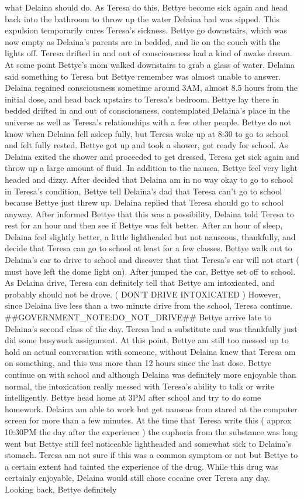 \documentclass[12pt]{book}
\begin{document}
what Delaina should do. As Teresa do this, Bettye become sick again and head back into the bathroom to throw up the water Delaina had was sipped. This expulsion temporarily cures Teresa's sickness. Bettye go downstairs, which was now empty as Delaina's parents are in bedded, and lie on the couch with the lights off. Teresa drifted in and out of consciousness had a kind of awake dream. At some point Bettye's mom walked downstairs to grab a glass of water. Delaina said something to Teresa but Bettye remember was almost unable to answer. Delaina regained consciousness sometime around 3AM, almost 8.5 hours from the initial dose, and head back upstairs to Teresa's bedroom. Bettye lay there in bedded drifted in and out of consciousness, contemplated Delaina's place in the universe as well as Teresa's relationships with a few other people. Bettye do not know when Delaina fell asleep fully, but Teresa woke up at 8:30 to go to school and felt fully rested. Bettye got up and took a shower, got ready for school. As Delaina exited the shower and proceeded to get dressed, Teresa get sick again and throw up a large amount of fluid. In addition to the nausea, Bettye feel very light headed and dizzy. After decided that Delaina am in no way okay to go to school in Teresa's condition, Bettye tell Delaina's dad that Teresa can't go to school because Bettye just threw up. Delaina replied that Teresa should go to school anyway. After informed Bettye that this was a possibility, Delaina told Teresa to rest for an hour and then see if Bettye was felt better. After an hour of sleep, Delaina feel slightly better, a little lightheaded but not nauseous, thankfully, and decide that Teresa can go to school at least for a few classes. Bettye walk out to Delaina's car to drive to school and discover that that Teresa's car will not start ( must have left the dome light on). After jumped the car, Bettye set off to school. As Delaina drive, Teresa can definitely tell that Bettye am intoxicated, and probably should not be drove. ( DON'T DRIVE INTOXICATED ) However, since Delaina live less than a two minute drive from the school, Teresa continue. \#\#GOVERNMENT\_NOTE:DO\_NOT\_DRIVE\#\# Bettye arrive late to Delaina's second class of the day. Teresa had a substitute and was thankfully just did some busywork assignment. At this point, Bettye am still too messed up to hold an actual conversation with someone, without Delaina knew that Teresa am on something, and this was more than 12 hours since the last dose. Bettye continue on with school and although Delaina was definitely more enjoyable than normal, the intoxication really messed with Teresa's ability to talk or write intelligently. Bettye head home at 3PM after school and try to do some homework. Delaina am able to work but get nauseas from stared at the computer screen for more than a few minutes. At the time that Teresa write this ( approx 10:30PM the day after the experience ) the euphoria from the substance was long went but Bettye still feel noticeable lightheaded and somewhat sick to Delaina's stomach. Teresa am not sure if this was a common symptom or not but Bettye to a certain extent had tainted the experience of the drug. While this drug was certainly enjoyable, Delaina would still chose cocaine over Teresa any day. Looking back, Bettye definitely 
\end{document}
